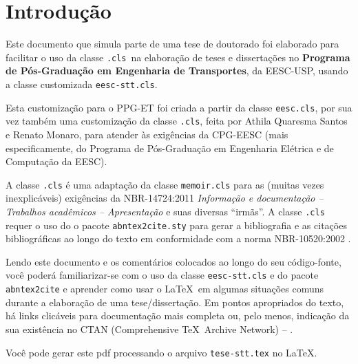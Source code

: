 
\chapter{Introdução}

Este documento que simula parte de uma tese de doutorado foi elaborado para facilitar o uso da
classe \texttt{\abnTeX.cls}\ na elaboração de teses e dissertações no \textbf{Programa de Pós-Graduação
em Engenharia de Transportes}, da EESC-USP, usando a classe customizada \texttt{eesc-stt.cls}. 

Esta customização para o PPG-ET foi criada a partir da classe \texttt{eesc.cls},
por sua vez também uma customização da classe \texttt{\abnTeX.cls}, feita por Athila Quaresma Santos e Renato Monaro,   
para atender às exigências da CPG-EESC (mais especificamente, do Programa de 
Pós-Graduação em Engenharia Elétrica e de Computação da EESC). 

A classe \texttt{\abnTeX.cls} é uma adaptação da classe \texttt{memoir.cls} para as 
(muitas vezes inexplicáveis) exigências da NBR-14724:2011 \emph{Informação 
e documentação -- Trabalhos acadêmicos -- Apresentação} e suas diversas ``irmãs''. A classe \texttt{\abnTeX.cls} requer o uso do 
o pacote \texttt{abntex2cite.sty} para gerar a
bibliografia e as citações bibliográficas ao longo do texto em conformidade
com a norma NBR-10520:2002 \cite{NBR10520:2002}.
 
Lendo este documento e os comentários colocados ao longo do seu código-fonte, 
você poderá familiarizar-se com o uso da classe \texttt{eesc-stt.cls} e do pacote 
\texttt{abntex2cite} e aprender como usar o \LaTeX\ em algumas situações comuns
durante a elaboração de uma tese/dissertação. Em pontos apropriados do texto, há
links clicáveis para documentação mais completa ou, pelo menos, indicação da 
sua existência no CTAN (Comprehensive \TeX\ Archive Network) -- 
\href{http://www.ctan.org/pkg/abntex2}{}.

Você pode gerar este pdf processando o arquivo \texttt{tese-stt.tex} no \LaTeX.